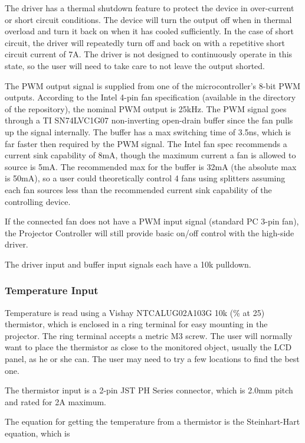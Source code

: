 \documentclass{article}
\begin{document}
The driver has a thermal shutdown feature to protect the device in over-current or short circuit
conditions.  The device will turn the output off when in thermal overload and turn it back on when
it has cooled sufficiently.  In the case of short circuit, the driver will repeatedly turn off and
back on with a repetitive short circuit current of 7A.  The driver is not designed to continuously
operate in this state, so the user will need to take care to not leave the output shorted.

The PWM output signal is supplied from one of the microcontroller's 8-bit PWM outputs.  According to
the Intel 4-pin fan specification (available in the  directory of the
repository), the nominal PWM output is 25kHz.  The PWM signal goes through a TI SN74LVC1G07
non-inverting open-drain buffer since the fan pulls up the signal internally. The buffer has a max
switching time of 3.5ns, which is far faster then required by the PWM signal.  The Intel fan spec
recommends a current sink capability of 8mA, though the maximum current a fan is allowed to source
is 5mA.  The recommended max for the buffer is 32mA (the absolute max is 50mA), so a user could
theoretically control 4 fans using splitters assuming each fan sources less than the recommended
current sink capability of the controlling device.

If the connected fan does not have a PWM input signal (standard PC 3-pin fan), the Projector
Controller will still provide basic on/off control with the high-side driver.

The driver input and buffer input signals each have a 10k\textOmega{} pulldown.

\subsubsection{Temperature Input} \label{sssec:TempInput}
Temperature is read using a Vishay NTCALUG02A103G 10k (\% at 25\textcelsius) thermistor,
which is enclosed in a ring terminal for easy mounting in the projector.  The ring terminal accepts
a metric M3 screw.  The user will normally want to place the thermistor as close to the monitored
object, usually the LCD panel, as he or she can.  The user may need to try a few locations to find
the best one.

The thermistor input is a 2-pin JST PH Series connector, which is 2.0mm pitch and rated for 2A maximum.

The equation for getting the temperature from a thermistor is the Steinhart-Hart equation, which is
\end{document}
